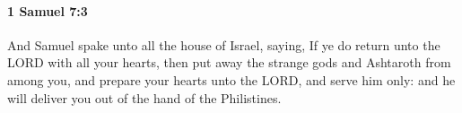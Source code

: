
		\paragraph{1 Samuel 7:3} %
			\label{1SAMUEL-7-3}

			And Samuel spake unto all the house of Israel, saying, If ye do return unto the LORD with all your hearts, then put away the strange gods and Ashtaroth from among you, and prepare your hearts unto the LORD, and serve him only: and he will deliver you out of the hand of the Philistines.


